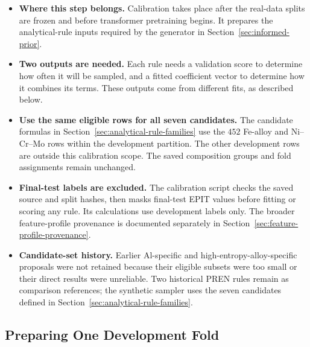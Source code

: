 \documentclass[11pt]{article}
\newenvironment{notes}
  {\begin{itemize}\setlength{\itemsep}{0.45em}\setlength{\parsep}{0pt}}
  {\end{itemize}}
\begin{document}
\begin{notes}
    \item \textbf{Where this step belongs.}
    Calibration takes place after the real-data splits are
    frozen and before transformer pretraining begins.
    It prepares the analytical-rule inputs required by the
    generator in Section~\ref{sec:informed-prior}.

    \item \textbf{Two outputs are needed.}
    Each rule needs a validation score to determine how often
    it will be sampled, and a fitted coefficient vector to
    determine how it combines its terms.
    These outputs come from different fits, as described below.

    \item \textbf{Use the same eligible rows for all seven candidates.}
    The candidate formulas in
    Section~\ref{sec:analytical-rule-families} use the
    \(452\) Fe-alloy and Ni--Cr--Mo rows within the development
    partition. The other development rows are outside this
    calibration scope. The saved composition groups and fold
    assignments remain unchanged.

    \item \textbf{Final-test labels are excluded.}
    The calibration script checks the saved source and split
    hashes, then masks final-test EPIT values before fitting
    or scoring any rule. Its calculations use development
    labels only. The broader feature-profile provenance is
    documented separately in
    Section~\ref{sec:feature-profile-provenance}.

    \item \textbf{Candidate-set history.}
    Earlier Al-specific and high-entropy-alloy-specific
    proposals were not retained because their eligible subsets
    were too small or their direct results were unreliable.
    Two historical PREN rules remain as comparison references;
    the synthetic sampler uses the seven candidates defined
    in Section~\ref{sec:analytical-rule-families}.
\end{notes}

\subsection{Preparing One Development Fold}
\label{sec:calibration-fold-inputs}
\end{document}
